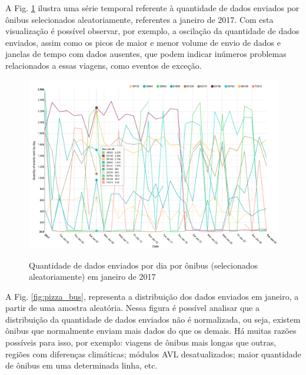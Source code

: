 \documentclass[
	12pt,				%
	oneside,			%
	a4paper,			%
	english,			%
	brazil				%
	]{abntex2ppgsi}
\begin{document}
{{A Fig. \ref {fig:analysis_by_bus_lines} ilustra uma série temporal referente à quantidade de dados enviados por ônibus selecionados aleatoriamente, referentes a janeiro de 2017. Com esta visualização é possível observar, por exemplo, a oscilação da quantidade de dados enviados, assim como os picos de maior e menor volume de envio de dados e janelas de tempo com dados ausentes, que podem indicar inúmeros problemas relacionados a essas viagens, como eventos de exceção.

\begin{figure}[!htb]%
	\centering
 	  \caption{Quantidade de dados enviados por dia  por ônibus (selecionados aleatoriamente) em janeiro de 2017}
		\includegraphics[width=1\linewidth]{images/analysis_by_bus_lines.png}
	\label{fig:analysis_by_bus_lines}
\end{figure}

A Fig. \ref{fig:pizza_bus}, representa a distribuição dos dados enviados em janeiro, a partir de uma amostra aleatória. Nessa figura é possível analisar que a distribuição da quantidade de dados enviados não é normalizada, ou seja, existem ônibus que normalmente enviam mais dados do que os demais. Há muitas razões possíveis para isso, por exemplo: viagens de ônibus mais longas que outras, regiões com diferenças climáticas; módulos AVL desatualizados; maior quantidade de ônibus em uma determinada linha, etc.

}}
\end{document}

